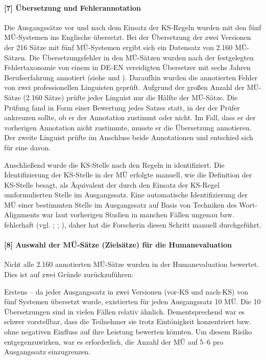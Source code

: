\paragraph*{[7] Übersetzung und Fehlerannotation}

Die Ausgangssätze vor und nach dem Einsatz der KS-Regeln wurden mit den fünf MÜ-Systemen ins Englische übersetzt. Bei der Übersetzung der zwei Versionen der 216 Sätze mit fünf MÜ-Sys\-te\-men ergibt sich ein Datensatz von 2.160 MÜ-Sätzen. Die Übersetzungsfehler in den MÜ-Sätzen wurden nach der festgelegten Fehlertaxonomie von einem in DE-EN vereidigten Übersetzer mit sechs Jahren Berufserfahrung annotiert (siehe  und ). Daraufhin wurden die annotierten Fehler von zwei professionellen Linguisten geprüft. Aufgrund der großen Anzahl der MÜ-Sätze (2.160 Sätze) prüfte jeder Linguist nur die Hälfte der MÜ-Sätze. Die Prüfung fand in Form einer Bewertung jedes Satzes statt, in der der Prüfer ankreuzen sollte, ob er der Annotation zustimmt oder nicht. Im Fall, dass er der vorherigen Annotation nicht zustimmte, musste er die Übersetzung annotieren. Der zweite Linguist prüfte im Anschluss beide Annotationen und entschied sich für eine davon.

Anschließend wurde die KS-Stelle nach den Regeln in  identifiziert. Die Identifizierung der KS-Stelle in der MÜ erfolgte manuell, wie die Definition der KS-Stelle besagt, als Äquivalent der durch den Einsatz der KS-Regel umformulierten Stelle im Ausgangssatz. Eine automatische Identifizierung der MÜ einer bestimmten Stelle im Ausgangssatz auf Basis von Techniken des Wort-Alignments war laut vorherigen Studien in manchen Fällen ungenau bzw. fehlerhaft (vgl. \citealt{KöhnEtAl2003}; \citealt{OchNey2004}; \citealt{Callison-BurchEtAl2007}), daher hat die Forscherin diesen Schritt manuell durchgeführt.

\paragraph*{[8] Auswahl der MÜ-Sätze (Zielsätze) für die Humanevaluation}

Nicht alle 2.160 annotierten MÜ-Sätze wurden in der Humanevaluation bewertet. Dies ist auf zwei Gründe zurückzuführen:

Erstens -- da jeder Ausgangssatz in zwei Versionen (vor-KS und nach-KS) von fünf Systemen übersetzt wurde, existierten für jeden Ausgangssatz 10 MÜ. Die 10 Übersetzungen sind in vielen Fällen relativ ähnlich. Dementsprechend war es schwer vorstellbar, dass die Teilnehmer sie trotz Eintönigkeit konzentriert bzw. ohne negativen Einfluss auf ihre Leistung bewerten könnten. Um diesem Risiko entgegenzuwirken, war es erforderlich, die Anzahl der MÜ auf 5--6 pro Ausgangssatz einzugrenzen.

